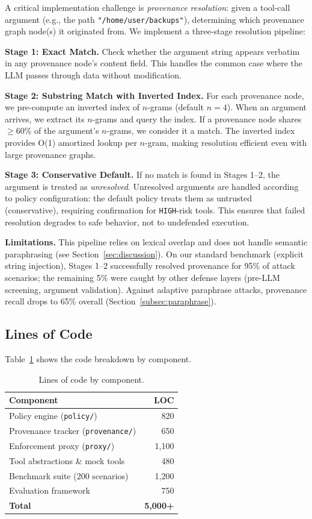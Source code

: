 A critical implementation challenge is \emph{provenance resolution}: given a tool-call argument (e.g., the path \texttt{"/home/user/backups"}), determining which provenance graph node(s) it originated from. We implement a three-stage resolution pipeline:

\textbf{Stage 1: Exact Match.} Check whether the argument string appears verbatim in any provenance node's content field. This handles the common case where the LLM passes through data without modification.

\textbf{Stage 2: Substring Match with Inverted Index.} For each provenance node, we pre-compute an inverted index of $n$-grams (default $n=4$). When an argument arrives, we extract its $n$-grams and query the index. If a provenance node shares $\geq$60\% of the argument's $n$-grams, we consider it a match. The inverted index provides O(1) amortized lookup per $n$-gram, making resolution efficient even with large provenance graphs.

\textbf{Stage 3: Conservative Default.} If no match is found in Stages 1--2, the argument is treated as \emph{unresolved}. Unresolved arguments are handled according to policy configuration: the default policy treats them as untrusted (conservative), requiring confirmation for \texttt{HIGH}-risk tools. This ensures that failed resolution degrades to safe behavior, not to undefended execution.

\textbf{Limitations.} This pipeline relies on lexical overlap and does not handle semantic paraphrasing (see Section~\ref{sec:discussion}). On our standard benchmark (explicit string injection), Stages 1--2 successfully resolved provenance for 95\% of attack scenarios; the remaining 5\% were caught by other defense layers (pre-LLM screening, argument validation). Against adaptive paraphrase attacks, provenance recall drops to 65\% overall (Section~\ref{subsec:paraphrase}).

\subsection{Lines of Code}

Table~\ref{tab:loc} shows the code breakdown by component.

\begin{table}[h]
\centering
\small
\caption{Lines of code by component.}
\label{tab:loc}
\begin{tabular}{lr}
\toprule
\textbf{Component} & \textbf{LOC} \\
\midrule
Policy engine (\texttt{policy/}) & 820 \\
Provenance tracker (\texttt{provenance/}) & 650 \\
Enforcement proxy (\texttt{proxy/}) & 1,100 \\
Tool abstractions \& mock tools & 480 \\
Benchmark suite (200 scenarios) & 1,200 \\
Evaluation framework & 750 \\
\midrule
\textbf{Total} & \textbf{5,000+} \\
\bottomrule
\end{tabular}
\end{table}

